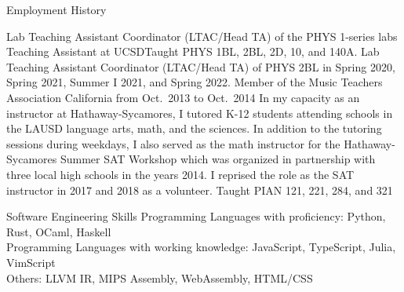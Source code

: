 \documentclass{cv}
\begin{document}
\begin{block}{Employment History}
  \begin{entries}
      {Lab Teaching Assistant Coordinator (LTAC/Head TA) of the PHYS 1-series
      labs}
      {Teaching Assistant at UCSD}{Taught PHYS 1BL, 2BL, 2D, 10, and 140A. Lab
      Teaching Assistant Coordinator (LTAC/Head TA) of PHYS 2BL in Spring 2020,
      Spring 2021, Summer I 2021, and Spring 2022.}
      {Member of the Music Teachers Association California from Oct.\ 2013 to Oct.\ 2014}
      {In my capacity as an instructor at Hathaway-Sycamores, I tutored K-12
      students attending schools in the LAUSD language arts, math, and the
      sciences. In addition to the tutoring sessions during weekdays, I also
      served as the math instructor for the Hathaway-Sycamores Summer SAT Workshop
      which was organized in partnership with three local high schools in the
      years 2014. I reprised the role as the SAT instructor in 2017
      and 2018 as a volunteer.}
      {Taught PIAN 121, 221, 284, and 321}
  \end{entries}
\end{block}

\begin{block}{Software Engineering Skills}
  Programming Languages with proficiency: Python, Rust, OCaml, Haskell\\
  Programming Languages with working knowledge: JavaScript, TypeScript, Julia, VimScript\\
  Others: LLVM IR, MIPS Assembly, WebAssembly, HTML/CSS
\end{block}

\begin{refsection}[papers]
  \nocite{*}
  \printbibliography[title=Peer Reviewed Publications]
\end{refsection}

\begin{refsection}[talks]
  \nocite{*}
  \printbibliography[title=Talks and Presentations]
\end{refsection}
\end{document}
